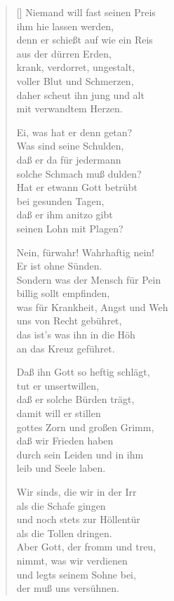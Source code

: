 \begin{multicols}{2}
\begin{verse}[\versewidth]
 Niemand will fast seinen Preis\\
ihm hie lassen werden,\\
denn er schießt auf wie ein Reis\\
aus der dürren Erden,\\
krank, verdorret, ungestalt,\\
voller Blut und Schmerzen,\\
daher scheut ihn jung und alt\\
mit verwandtem Herzen.

 Ei, was hat er denn getan?\\
Was sind seine Schulden,\\
daß er da für jedermann\\
solche Schmach muß dulden?\\
Hat er etwann Gott betrübt\\
bei gesunden Tagen,\\
daß er ihm anitzo gibt\\
seinen Lohn mit Plagen?

 Nein, fürwahr! Wahrhaftig nein!\\
Er ist ohne Sünden.\\
Sondern was der Mensch für Pein\\
billig sollt empfinden,\\
was für Krankheit, Angst und Weh\\
uns von Recht gebühret,\\
das ist's was ihn in die Höh\\
an das Kreuz geführet.

 Daß ihn Gott so heftig schlägt,\\
tut er unsertwillen,\\
daß er solche Bürden trägt,\\
damit will er stillen\\
gottes Zorn und großen Grimm,\\
daß wir Frieden haben\\
durch sein Leiden und in ihm\\
leib und Seele laben.

 Wir sinds, die wir in der Irr\\
als die Schafe gingen\\
und noch stets zur Höllentür\\
als die Tollen dringen.\\
Aber Gott, der fromm und treu,\\
nimmt, was wir verdienen\\
und legts seinem Sohne bei,\\
der muß uns versühnen.


\end{verse}
\end{multicols}
